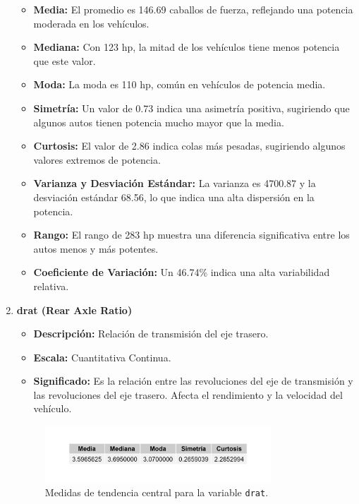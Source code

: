 \documentclass{article}
\begin{document}
\begin{enumerate}
	      \begin{itemize}
		      \item \textbf{Media:} El promedio es 146.69 caballos de fuerza, reflejando una potencia moderada en los vehículos.
		      \item \textbf{Mediana:} Con 123 hp, la mitad de los vehículos tiene menos potencia que este valor.
		      \item \textbf{Moda:} La moda es 110 hp, común en vehículos de potencia media.
		      \item \textbf{Simetría:} Un valor de 0.73 indica una asimetría positiva, sugiriendo que algunos autos tienen potencia mucho mayor que la media.
		      \item \textbf{Curtosis:} El valor de 2.86 indica colas más pesadas, sugiriendo algunos valores extremos de potencia.
		      \item \textbf{Varianza y Desviación Estándar:} La varianza es 4700.87 y la desviación estándar 68.56, lo que indica una alta dispersión en la potencia.
		      \item \textbf{Rango:} El rango de 283 hp muestra una diferencia significativa entre los autos menos y más potentes.
		      \item \textbf{Coeficiente de Variación:} Un 46.74\% indica una alta variabilidad relativa.
	      \end{itemize}

	\item \textbf{drat (Rear Axle Ratio)}

	      \begin{itemize}
		      \item \textbf{Descripción:} Relación de transmisión del eje trasero.
		      \item \textbf{Escala:} Cuantitativa Continua.
		      \item \textbf{Significado:} Es la relación entre las revoluciones del eje de transmisión y las revoluciones del eje trasero. Afecta el rendimiento y la velocidad del vehículo.
	      \end{itemize}

	      \begin{figure}[H]
		      \centering
		      \includegraphics[width=0.8\textwidth]{MTC/drat_central.png}
		      \caption{Medidas de tendencia central para la variable \texttt{drat}.}
		      \label{fig:drat_central}
	      \end{figure}


\end{enumerate}
\end{document}
